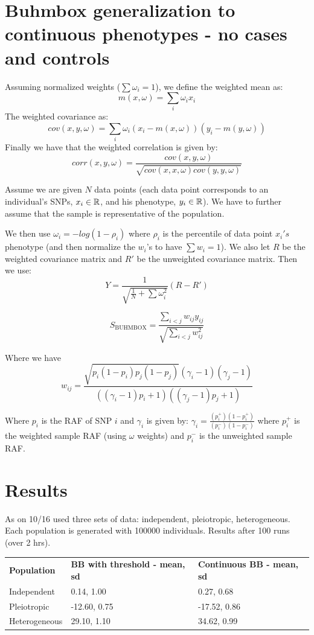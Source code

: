 \documentclass[11pt]{hw-template}
\begin{document}
\maketitle

\section*{Buhmbox generalization to continuous phenotypes - no cases and controls}

\noindent Assuming normalized weights ($\sum \omega_i = 1$), we define the weighted mean as:
$$m(x, \omega) = \sum_i \omega_i x_i$$
The weighted covariance as:
$$cov(x, y, \omega) = \sum_i \omega_i(x_i - m(x, \omega))(y_i - m(y, \omega))$$
Finally we have that the weighted correlation is given by:
$$corr(x, y, \omega) = \frac{cov(x, y, \omega)}{\sqrt{cov(x, x, \omega)cov(y, y, \omega)}}$$

Assume we are given $N$ data points (each data point corresponds to an individual's SNPs, $x_i \in \operatorname{\mathbb{R}}$, and his phenotype, $y_i \in \operatorname{\mathbb{R}}$). We have to further assume that the sample is 
representative of the population.

We then use $\omega_i = -log(1-\rho_i)$ where $\rho_i$ is the percentile of data point $x_i's$ phenotype (and then normalize the $w_i$'s to have $\sum w_i = 1$). We also let $R$ be the weighted
covariance matrix and $R'$ be the unweighted covariance matrix.
Then we use:
$$ Y = \frac{1}{\sqrt{\frac{1}{N} + \sum \omega_i^2}} (R-R')$$

$$S_\text{BUHMBOX} = \frac{\sum_{i < j} w_{ij}y_{ij}}{\sqrt{\sum_{i<j}w_{ij}^2}}$$

Where we have
$$w_{ij} = \frac{\sqrt{p_i(1-p_i)p_j(1-p_j)}(\gamma_i - 1)(\gamma_j - 1)}{((\gamma_i-1)p_i + 1)((\gamma_j - 1)p_j + 1)}$$

Where $p_i$ is the RAF of SNP $i$ and $\gamma_i$ is given by:
$\gamma_i = \frac{(p_i^+)(1-p_i^+)}{(p_i^-)(1-p_i^-)}$ where $p_i^+$ is the weighted sample RAF (using $\omega$ weights) and $p_i^-$ is the unweighted sample RAF.

\section*{Results}

As on 10/16 used three sets of data: independent, pleiotropic, heterogeneous. Each population is generated with 100000 individuals. Results after 100 runs (over 2 hrs).
\begin{table}[h!]
    \begin{tabular}{lll}
      \textbf{Population} & \textbf{BB with threshold - mean, sd} & \textbf{Continuous BB - mean, sd} \\
      Independent   & 0.14, 1.00     &  0.27, 0.68 \\
      Pleiotropic   & -12.60, 0.75   &  -17.52, 0.86\\
      Heterogeneous & 29.10, 1.10    &  34.62, 0.99
    \end{tabular}
\end{table}
\end{document}
